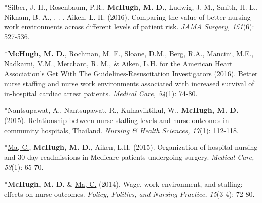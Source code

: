 \documentclass[10pt,]{article}
\begin{document}
{{{{{{{{{{{{{{{\begin{hangparas}{.25in}{1}
\end{hangparas}



\begin{hangparas}{.25in}{1}

*Silber, J. H., Rosenbaum, P.R., {\textbf {McHugh, M. D.}}, Ludwig, J. M., Smith, H. L., Niknam, B. A., . . . Aiken, L. H. (2016). Comparing the value of better nursing work environments across different levels of patient risk. {\textit {JAMA Surgery, 151}}(6): 527-536.

\end{hangparas}



\begin{hangparas}{.25in}{1}

*{\textbf {McHugh, M. D.}}, {\underline {Rochman, M. F.}}, Sloane, D.M., Berg, R.A., Mancini, M.E., Nadkarni, V.M., Merchant, R. M., \& Aiken, L.H. for the American Heart Association’s Get With The Guidelines-Resuscitation Investigators (2016). Better nurse staffing and nurse work environments associated with increased survival of in-hospital cardiac arrest patients. {\textit {Medical Care, 54}}(1): 74-80.

\end{hangparas}



\begin{hangparas}{.25in}{1}

*Nantsupawat, A., Nantsupawat, R., Kulnaviktikul, W., {\textbf {McHugh, M. D.}} (2015). Relationship between nurse staffing levels and nurse outcomes in community hospitals, Thailand. {\textit {Nursing \& Health Sciences, 17}}(1): 112-118.

\end{hangparas}



\begin{hangparas}{.25in}{1}

*{\underline {Ma, C.}}, {\textbf {McHugh, M. D.}}, Aiken, L.H. (2015). Organization of hospital nursing and 30-day readmissions in Medicare patients undergoing surgery. {\textit {Medical Care, 53}}(1): 65-70.

\end{hangparas}



\begin{hangparas}{.25in}{1}

*{\textbf {McHugh, M. D.}} \& {\underline {Ma, C.}} (2014). Wage, work environment, and staffing: effects on nurse outcomes. {\textit {Policy, Politics, and Nursing Practice, 15}}(3-4): 72-80.


\end{hangparas}}}}}}}}}}}}}}}}
\end{document}
